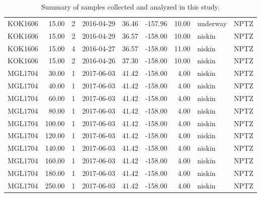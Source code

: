\begin{table}[ht]
\begin{tabular}{lrrlrrrll}
  KOK1606 & 15.00 &   2 & 2016-04-29 & 36.46 & -157.96 & 10.00 & underway & NPTZ \\ 
  KOK1606 & 15.00 &   2 & 2016-04-29 & 36.57 & -158.00 & 10.00 & niskin & NPTZ \\ 
  KOK1606 & 15.00 &   4 & 2016-04-27 & 36.57 & -158.00 & 11.00 & niskin & NPTZ \\ 
  KOK1606 & 15.00 &   2 & 2016-04-26 & 37.30 & -158.00 & 10.00 & niskin & NPTZ \\ 
  MGL1704 & 30.00 &   1 & 2017-06-03 & 41.42 & -158.00 & 4.00 & niskin & NPTZ \\ 
  MGL1704 & 40.00 &   1 & 2017-06-03 & 41.42 & -158.00 & 4.00 & niskin & NPTZ \\ 
  MGL1704 & 60.00 &   1 & 2017-06-03 & 41.42 & -158.00 & 4.00 & niskin & NPTZ \\ 
  MGL1704 & 80.00 &   1 & 2017-06-03 & 41.42 & -158.00 & 4.00 & niskin & NPTZ \\ 
  MGL1704 & 100.00 &   1 & 2017-06-03 & 41.42 & -158.00 & 4.00 & niskin & NPTZ \\ 
  MGL1704 & 120.00 &   1 & 2017-06-03 & 41.42 & -158.00 & 4.00 & niskin & NPTZ \\ 
  MGL1704 & 140.00 &   1 & 2017-06-03 & 41.42 & -158.00 & 4.00 & niskin & NPTZ \\ 
  MGL1704 & 160.00 &   1 & 2017-06-03 & 41.42 & -158.00 & 4.00 & niskin & NPTZ \\ 
  MGL1704 & 180.00 &   1 & 2017-06-03 & 41.42 & -158.00 & 4.00 & niskin & NPTZ \\ 
  MGL1704 & 250.00 &   1 & 2017-06-03 & 41.42 & -158.00 & 4.00 & niskin & NPTZ \\ 
   \hline
\end{tabular}
\caption{\label{EnviroSampleDescriptions}Summary of samples collected and analyzed in this study.} 
\end{table}
